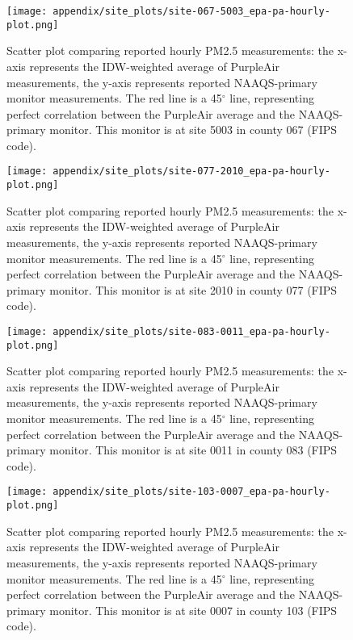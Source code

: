 \begin{figure}
\centering
\texttt{[image: appendix/site\_plots/site-067-5003\_epa-pa-hourly-plot.png]}
\caption{Scatter plot comparing reported hourly PM2.5 measurements: the x-axis represents the IDW-weighted average of PurpleAir measurements, the y-axis represents reported NAAQS-primary monitor measurements. The red line is a 45$^\circ$ line, representing perfect correlation between the PurpleAir average and the NAAQS-primary monitor. This monitor is at site 5003 in county 067 (FIPS code).}
\label{fig:pa-epa-compare_067-5003}
\end{figure}
\begin{figure}
\centering
\texttt{[image: appendix/site\_plots/site-077-2010\_epa-pa-hourly-plot.png]}
\caption{Scatter plot comparing reported hourly PM2.5 measurements: the x-axis represents the IDW-weighted average of PurpleAir measurements, the y-axis represents reported NAAQS-primary monitor measurements. The red line is a 45$^\circ$ line, representing perfect correlation between the PurpleAir average and the NAAQS-primary monitor. This monitor is at site 2010 in county 077 (FIPS code).}
\label{fig:pa-epa-compare_077-2010}
\end{figure}
\begin{figure}
\centering
\texttt{[image: appendix/site\_plots/site-083-0011\_epa-pa-hourly-plot.png]}
\caption{Scatter plot comparing reported hourly PM2.5 measurements: the x-axis represents the IDW-weighted average of PurpleAir measurements, the y-axis represents reported NAAQS-primary monitor measurements. The red line is a 45$^\circ$ line, representing perfect correlation between the PurpleAir average and the NAAQS-primary monitor. This monitor is at site 0011 in county 083 (FIPS code).}
\label{fig:pa-epa-compare_083-0011}
\end{figure}
\begin{figure}
\centering
\texttt{[image: appendix/site\_plots/site-103-0007\_epa-pa-hourly-plot.png]}
\caption{Scatter plot comparing reported hourly PM2.5 measurements: the x-axis represents the IDW-weighted average of PurpleAir measurements, the y-axis represents reported NAAQS-primary monitor measurements. The red line is a 45$^\circ$ line, representing perfect correlation between the PurpleAir average and the NAAQS-primary monitor. This monitor is at site 0007 in county 103 (FIPS code).}
\label{fig:pa-epa-compare_103-0007}
\end{figure}
